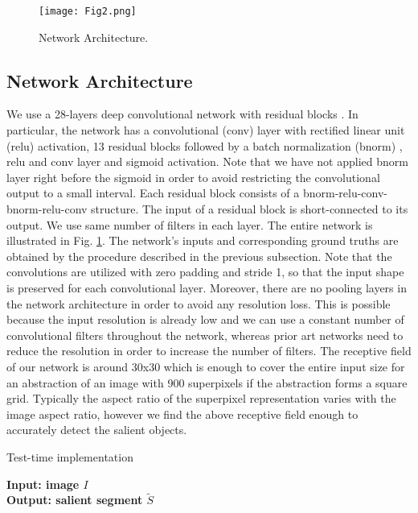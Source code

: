 \documentclass[a4paper,conference]{IEEEtran}
\begin{document}
\begin{figure}[!t]
\centering
\texttt{[image: Fig2.png]}
\caption{Network Architecture.}
\label{fig2}
\end{figure}

\subsection{Network Architecture}
We use a 28-layers deep convolutional network with residual blocks \cite{He}.
In particular, the network has a convolutional (conv) layer with rectified linear unit \cite{Nair} (relu) activation, 13 residual blocks followed by a batch normalization \cite{Ioffe} (bnorm) , relu and conv layer and sigmoid activation.
Note that we have not applied bnorm layer right before the sigmoid in order to avoid restricting the convolutional output to a small interval.
Each residual block consists of a bnorm-relu-conv-bnorm-relu-conv structure.
The input of a residual block is short-connected to its output.
We use same number of filters in each layer.
The entire network is illustrated in Fig. \ref{fig2}.
The network's inputs and corresponding ground truths are obtained by the procedure described in the previous subsection.
Note that the convolutions are utilized with zero padding and stride 1, so that the input shape is preserved for each convolutional layer.
Moreover, there are no pooling layers in the network architecture in order to avoid any resolution loss.
This is possible because the input resolution is already low and we can use a constant number of convolutional filters throughout the network, whereas prior art networks need to reduce the resolution in order to increase the number of filters.
The receptive field of our network is around 30x30 which is enough to cover the entire input size for an abstraction of an image with 900 superpixels if the abstraction forms a square grid.
Typically the aspect ratio of the superpixel representation varies with the image aspect ratio, however we find the above receptive field enough to accurately detect the salient objects.


\begin{algorithm}
\caption{Test-time implementation}\label{testalgorithm}
\hspace*{\algorithmicindent} \textbf{Input: image $ I $} \\
\hspace*{\algorithmicindent} \textbf{Output: salient segment $ \tilde{S} $ }
\begin{algorithmic}[1] \\
 \\
 \\
 \\
\end{algorithmic}
\end{algorithm}
\end{document}
